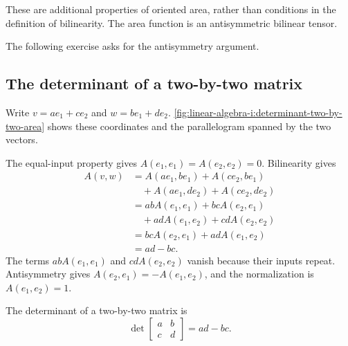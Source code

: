These are additional properties of oriented area, rather than conditions
in the definition of bilinearity.
The area function is an antisymmetric bilinear tensor.

The following exercise asks for the antisymmetry argument.


\newpage
\subsection{The determinant of a two-by-two matrix}

Write \(v=ae_1+ce_2\) and \(w=be_1+de_2\).
\autoref{fig:linear-algebra-i:determinant-two-by-two-area} shows these
coordinates and the parallelogram spanned by the two vectors.

\begin{marginfigure}
  \centering
  
  \caption[Two-by-two determinant as oriented area]{Basis-coordinate
    schematic for \(v=ae_1+ce_2\) and \(w=be_1+de_2\). The shaded
    parallelogram has oriented area \(ad-bc\), positive in the pictured
    configuration.}
  \label{fig:linear-algebra-i:determinant-two-by-two-area}
\end{marginfigure}

The equal-input property gives \(A(e_1,e_1)=A(e_2,e_2)=0\).
Bilinearity gives
\[
  \begin{aligned}
    A(v,w)
      &=A(ae_1,be_1)+A(ce_2,be_1)\\
      &\quad+A(ae_1,de_2)+A(ce_2,de_2)\\
      &=abA(e_1,e_1)+bcA(e_2,e_1)\\
      &\quad+adA(e_1,e_2)+cdA(e_2,e_2)\\
      &=bcA(e_2,e_1)+adA(e_1,e_2)\\
      &=ad-bc.
  \end{aligned}
\]
The terms \(abA(e_1,e_1)\) and \(cdA(e_2,e_2)\) vanish because their
inputs repeat. Antisymmetry gives
\(A(e_2,e_1)=-A(e_1,e_2)\), and the normalization is
\(A(e_1,e_2)=1\).

\begin{definition}
  The determinant of a two-by-two matrix is
  \[
    \det\begin{bmatrix}a&b\\c&d\end{bmatrix}=ad-bc.
  \]
\end{definition}

